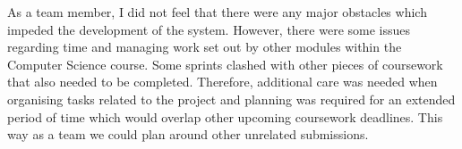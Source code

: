 As a team member, I did not feel that there were any major obstacles which impeded the development of the system. However, there were some issues regarding time and managing work set out by other modules within the Computer Science course. Some sprints clashed with other pieces of coursework that also needed to be completed. Therefore, additional care was needed when organising tasks related to the project and planning was required for an extended period of time which would overlap other upcoming coursework deadlines. This way as a team we could plan around other unrelated submissions.